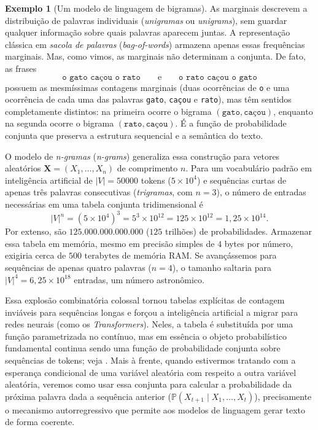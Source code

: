 \documentclass[12pt,portuguese]{article}
\theoremstyle{definition}
\newtheorem{example}[example]{Exemplo}
\begin{document}
\begin{example}[Um modelo de linguagem de bigramas]
As marginais descrevem a distribuição de palavras individuais (\emph{unigramas}
ou \emph{unigrams}), sem guardar qualquer informação sobre quais palavras
aparecem juntas. A representação clássica em \emph{sacola de palavras}
(\emph{bag-of-words}) armazena apenas essas frequências marginais. Mas, como
vimos, as marginais não determinam a conjunta. De fato, as frases
\[
\texttt{o gato caçou o rato}\qquad\text{e}\qquad\texttt{o rato caçou o gato}
\]
possuem as mesmíssimas contagens marginais (duas ocorrências de \texttt{o} e uma
ocorrência de cada uma das palavras \texttt{gato}, \texttt{caçou} e
\texttt{rato}), mas têm sentidos completamente distintos: na primeira ocorre o
bigrama $(\texttt{gato}, \texttt{caçou})$, enquanto na segunda ocorre o bigrama
$(\texttt{rato}, \texttt{caçou})$. É a função de probabilidade conjunta que
preserva a estrutura sequencial e a semântica do texto.

O modelo de \emph{n-gramas} (\emph{n-grams}) generaliza essa construção para
vetores aleatórios $\mathbf{X}=(X_1,\ldots,X_n)$ de comprimento $n$. Para um
vocabulário padrão em inteligência artificial de $|V|=50000$ tokens
($5\times 10^4$) e sequências curtas de apenas três palavras consecutivas
(\emph{trigramas}, com $n=3$), o número de entradas necessárias em uma tabela
conjunta tridimensional é
\[
|V|^{n} = (5\times 10^4)^{3} = 5^3 \times 10^{12} = 125\times 10^{12} = 1{,}25\times 10^{14}.
\]
Por extenso, são $125.000.000.000.000$ ($125$ trilhões) de probabilidades.
Armazenar essa tabela em memória, mesmo em precisão simples de $4$ bytes por
número, exigiria cerca de $500\text{ terabytes}$ de memória RAM. Se
avançássemos para sequências de apenas quatro palavras ($n=4$), o tamanho
saltaria para $|V|^4 = 6{,}25\times 10^{18}$ entradas, um número astronômico.

Essa explosão combinatória colossal tornou tabelas explícitas de contagem
inviáveis para sequências longas e forçou a inteligência artificial a migrar
para redes neurais (como os \emph{Transformers}). Neles, a tabela é substituída
por uma função parametrizada no contínuo, mas em essência o objeto probabilístico fundamental
continua sendo uma função de probabilidade conjunta sobre sequências de tokens;
veja \cite{JurafskyMartin}. Mais à frente, quando estivermos tratando
com a esperança condicional de uma variável aleatória com respeito a outra 
variável aleatória, 
veremos como usar essa conjunta para calcular a probabilidade da próxima palavra
dada a sequência anterior ($\mathbb{P}(X_{t+1}\mid X_1,\ldots,X_t)$),
precisamente o mecanismo autorregressivo que permite aos modelos de linguagem
gerar texto de forma coerente.
\end{example}
\end{document}
